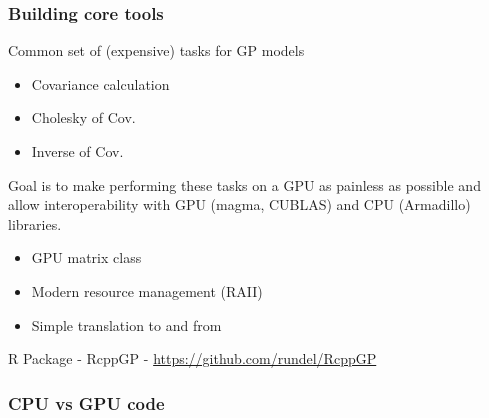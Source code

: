 \documentclass[t]{beamer}\usepackage[]{graphicx}\usepackage[]{color}
\begin{document}
\begin{frame}
\frametitle{Building core tools}

Common set of (expensive) tasks for GP models

\vspace{1mm}

\begin{itemize}
\item Covariance calculation
\item Cholesky of Cov. 
\item Inverse of Cov. 
\end{itemize}

\vspace{2mm}

Goal is to make performing these tasks on a GPU as painless as possible and allow interoperability with GPU (magma, CUBLAS) and CPU (Armadillo) libraries.

\begin{itemize}
\item GPU matrix class
\item Modern resource management (RAII)
\item Simple translation to and from
\end{itemize}

\vfill

R Package - RcppGP - \url{https://github.com/rundel/RcppGP}

\end{frame}


\begin{frame}[label=code]
\frametitle{CPU vs GPU code}

\vfill

\begin{center}

\vspace{10mm}

\end{center}

\vfill


\hyperlink{pm_lessons}{}
\end{frame}
\end{document}
